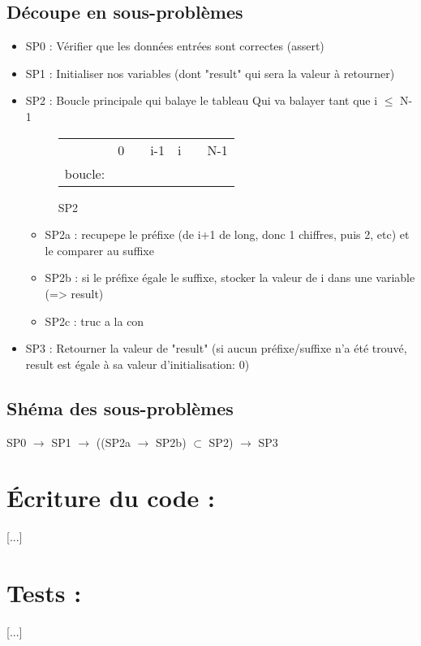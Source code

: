 \documentclass[a4paper, 11pt, oneside]{article}
\begin{document}
	\subsection{Découpe en sous-problèmes}
		\begin{itemize}
		
			\item SP0 : Vérifier que les données entrées sont correctes (assert)
			\item SP1 : Initialiser nos variables (dont "result" qui sera la valeur à retourner)
			\item SP2 : Boucle principale qui balaye le tableau
				\newline
				Qui va balayer tant que i $\leq$ N-1
				\begin{figure}[!h]
					\centering
					\begin{tabular}{l|llr|ll|l}
						& 0 &  & \multicolumn{1}{r|}{i-1} & i &  & N-1 \\ \cline{2-6}
						boucle: & \cellcolor[HTML]{FFCC67} & \cellcolor[HTML]{FFCC67} & \cellcolor[HTML]{FFCC67} &  &  &  \\ \cline{2-6}
					\end{tabular}
					\caption{SP2}
					\label{fig:exemple}
				\end{figure}
				\begin{itemize}
					\item SP2a : recupepe le préfixe (de i+1 de long, donc 1 chiffres, puis 2, etc) et le comparer au suffixe
					\item SP2b : si le préfixe égale le suffixe, stocker la valeur de i dans une variable (=> result)
                    \item SP2c : truc a la con
				\end{itemize}
			\item SP3 : Retourner la valeur de "result" (si aucun préfixe/suffixe n'a été trouvé, result est égale à sa valeur d'initialisation: 0)
		\end{itemize}
	\subsection{Shéma des sous-problèmes}
		SP0 $\rightarrow$ SP1 $\rightarrow$ ((SP2a $\rightarrow$ SP2b) $\subset$ SP2) $\rightarrow$ SP3

\section{\LARGE \bfseries Écriture du code :}
	[...]

\section{\LARGE \bfseries Tests : }
	[...]
\end{document}
